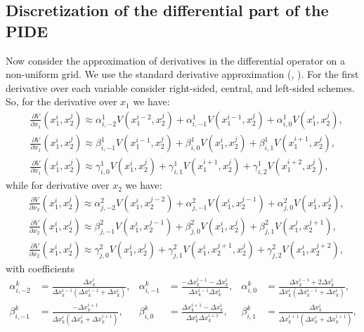 {\subsection{Discretization of the differential part of the PIDE}
Now consider the approximation of derivatives in the differential operator on a non-uniform grid. We use the standard derivative approximation (\cite{kluge2002}, \cite{in2010adi}). For the first derivative over each variable consider right-sided, central, and left-sided schemes. So, for the derivative over $x_1$ we have:
\begin{align}
&	\frac{\partial V}{\partial x_1}(x_1^i, x_2^j) \approx \alpha^1_{i, -2} V(x_1^{i-2}, x_2^j) + \alpha^1_{i, -1} V(x_1^{i-1}, x_2^j)+ \alpha^1_{i, 0} V(x_1^i, x_2^j), \label{D_x1_1}\\
&	\frac{\partial V}{\partial x_1}(x_1^i, x_2^j) \approx \beta^1_{i, -1} V(x_1^{i-1}, x_2^j) + \beta^1_{i, 0} V(x_1^{i}, x_2^j)+ \beta^1_{i, 1} V(x_1^{i+1}, x_2^j), \label{D_x1_center}\\
&	\frac{\partial V}{\partial x_1}(x_1^i, x_2^j) \approx \gamma^1_{i, 0} V(x_1^{i}, x_2^j) + \gamma^1_{i, 1} V(x_1^{i+1}, x_2^j)+ \gamma^1_{i, 2} V(x_1^{i+2}, x_2^j) \label{D_x1_2},
\end{align}
while for derivative over $x_2$ we have:
\begin{align}
&	\frac{\partial V}{\partial x_2}(x_1^i, x_2^j) \approx \alpha^2_{j, -2} V(x_1^i, x_2^{j-2}) + \alpha^2_{j, -1} V(x_1^i, x_2^{j-1})+ \alpha^2_{j, 0} V(x_1^i, x_2^j), \label{D_x2_1} \\
&	\frac{\partial V}{\partial x_2}(x_1^i, x_2^j) \approx \beta^2_{j, -1} V(x_1^i, x_2^{j-1}) + \beta^2_{j, 0} V(x_1^{i}, x_2^j)+ \beta^2_{j, 1} V(x_1^j, x_2^{j+1}), \label{D_x2_center}\\
&	\frac{\partial V}{\partial x_2}(x_1^i, x_2^j) \approx \gamma^2_{j, 0} V(x_1^{i}, x_2^j) + \gamma^2_{j, 1} V(x_1^i, x_2^{j+1}, x_2^j)+ \gamma^2_{j, 2} V(x_1^i, x_2^{j+2}), \label{D_x2_2}
\end{align}
with coefficients
\begin{equation*}
	\begin{aligned}
		\alpha^k_{i, -2} &= \frac{\Delta x_k^i}{\Delta x_k^{i-1} (\Delta x_k^{i-1} + \Delta x_k^i)},  & \alpha^k_{i, -1} &= \frac{-\Delta x_k^{i-1} - \Delta x_k^i}{\Delta x_k^{i-1} \Delta x_k^i},  &\alpha^k_{i, 0} &= \frac{\Delta x_k^{i-1} + 2 \Delta x_k^i}{\Delta x_k^i (\Delta x_k^{i-1} + \Delta x_k^i)} , \\
		\beta^k_{i, -1} &= \frac{-\Delta x_k^{i+1}}{\Delta x_k^{i} (\Delta x_k^{i} + \Delta x_k^{i+1})}, & \beta^k_{i, 0} &= \frac{\Delta x_k^{i+1} - \Delta x_k^i}{\Delta x_k^{i} \Delta x_k^{i+1}},  &\beta^k_{i, 1} &= \frac{\Delta x_k^{i}}{\Delta x_k^{i+1} (\Delta x_k^{i} + \Delta x_k^{i+1})} , \\

\end{aligned}
\end{equation*}}
